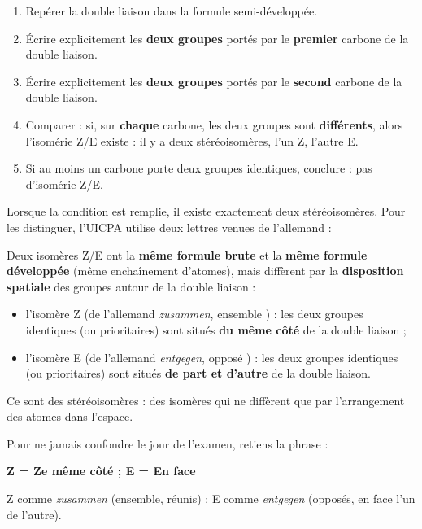 \documentclass[11pt]{article}
\newcommand{\cle}[1]{{\popxbold\color{popdark}#1}}
\newcounter{popsec}
\newcounter{popsub}
\newcommand{\courssub}[1]{%
  \stepcounter{popsub}%
  \par\vspace{9pt}\noindent{\popxbold\fontsize{11.5}{13}\selectfont\color{popink}{\color{poporange}\thepopsec.\thepopsub}\hspace{6pt}#1}\par\nopagebreak\vspace{4pt}
}
\begin{document}
\begin{methode}
\begin{enumerate}
\item Repérer la double liaison  dans la formule semi-développée.
\item Écrire explicitement les \textbf{deux groupes} portés par le \textbf{premier} carbone de la double liaison.
\item Écrire explicitement les \textbf{deux groupes} portés par le \textbf{second} carbone de la double liaison.
\item Comparer : si, sur \textbf{chaque} carbone, les deux groupes sont \textbf{différents}, alors l'isomérie Z/E existe : il y a deux stéréoisomères, l'un Z, l'autre E.
\item Si au moins un carbone porte deux groupes identiques, conclure : pas d'isomérie Z/E.
\end{enumerate}
\end{methode}

\courssub{Les descripteurs Z et E}

Lorsque la condition est remplie, il existe exactement deux stéréoisomères. Pour les distinguer, l'UICPA utilise deux lettres venues de l'allemand :

\begin{definition}[Isomères Z et E]
Deux isomères Z/E ont la \textbf{même formule brute} et la \textbf{même formule développée} (même enchaînement d'atomes), mais diffèrent par la \textbf{disposition spatiale} des groupes autour de la double liaison  :
\begin{itemize}
\item l'isomère \cle{Z} (de l'allemand \emph{zusammen}, \og ensemble \fg) : les deux groupes identiques (ou prioritaires) sont situés \textbf{du même côté} de la double liaison ;
\item l'isomère \cle{E} (de l'allemand \emph{entgegen}, \og opposé \fg) : les deux groupes identiques (ou prioritaires) sont situés \textbf{de part et d'autre} de la double liaison.
\end{itemize}
Ce sont des \cle{stéréoisomères} : des isomères qui ne diffèrent que par l'arrangement des atomes dans l'espace.
\end{definition}

\begin{aretenir}
Pour ne jamais confondre le jour de l'examen, retiens la phrase :
\begin{center}
\textbf{\og Z = Ze même côté ; E = En face \fg}
\end{center}
Z comme \emph{zusammen} (ensemble, réunis) ; E comme \emph{entgegen} (opposés, en face l'un de l'autre).
\end{aretenir}
\end{document}
